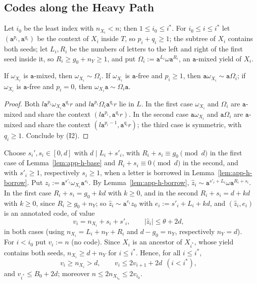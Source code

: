 \subsection{Codes along the Heavy Path}

Let $i_0$ be the least index with $n_{X_i}<n$; then $1\le i_0\le i^*$.  For
$i_0\le i\le i^*$ let $(\mathtt a^{p_i},\mathtt a^{q_i})$ be the context of
$X_i$ inside $T$, so $p_i+q_i\ge1$; the subtree of $X_i$ contains both seeds;
let $L_i,R_i$ be the numbers of letters to the left and right of the first seed
inside it, so $R_i\ge g_0+n_Y\ge1$, and put $\Omega_i:=\mathtt a^{L_i}\omega\mathtt
a^{R_i}$, an $\mathtt a$-mixed yield of $X_i$.

\begin{lemma}
\label{lem:app-h-borrow}
If $\omega_{X_i}$ is $\mathtt a$-mixed, then $\omega_{X_i}\sim\Omega_i$.  If
$\omega_{X_i}$ is $\mathtt a$-free and $p_i\ge1$, then $\mathtt a\omega_{X_i}\sim\mathtt
a\Omega_i$; if $\omega_{X_i}$ is $\mathtt a$-free and $p_i=0$, then
$\omega_{X_i}\mathtt a\sim\Omega_i\mathtt a$.
\end{lemma}

\begin{proof}
Both $l\mathtt a^{p_i}\omega_{X_i}\mathtt a^{q_i}r$ and $l\mathtt a^{p_i}\Omega_i
\mathtt a^{q_i}r$ lie in $L$.  In the first case $\omega_{X_i}$ and $\Omega_i$ are
$\mathtt a$-mixed and share the context $(l\mathtt a^{p_i},\mathtt a^{q_i}r)$.  In the
second case $\mathtt a\omega_{X_i}$ and $\mathtt a\Omega_i$ are $\mathtt a$-mixed and
share the context $(l\mathtt a^{p_i-1},\mathtt a^{q_i}r)$; the third case is
symmetric, with $q_i\ge1$.  Conclude by (I2).
\end{proof}

Choose $s_i',s_i\in[0,d]$ with $d\mid L_i+s'_i$, with $R_i+s_i\equiv g_0\pmod d$
in the first case of Lemma~\ref{lem:app-h-base} and $R_i+s_i\equiv0\pmod d$ in
the second, and with $s'_i\ge1$, respectively $s_i\ge1$, when a letter is
borrowed in Lemma~\ref{lem:app-h-borrow}.  Put $\hat z_i:=\mathtt
a^{s'_i}\omega_{X_i}\mathtt a^{s_i}$.  By Lemma~\ref{lem:app-h-borrow},
$\hat z_i\sim\mathtt a^{s'_i+L_i}\omega\mathtt a^{R_i+s_i}$.  In the first case
$R_i+s_i=g_0+kd$ with $k\ge0$, and in the second $R_i+s_i=d+kd$ with $k\ge0$,
since $R_i\ge g_0+n_Y$; so $\hat z_i\sim\mathtt a^{e_i}z_0$ with
$e_i:=s'_i+L_i+kd$, and $(\hat z_i,e_i)$ is an annotated code, of value
\[
 v_i=n_{X_i}+s_i+s'_i,\qquad|\hat z_i|\le\theta+2d,
\]
in both cases (using $n_{X_i}=L_i+n_Y+R_i$ and $d-g_0=n_Y$, respectively
$n_Y=d$).  For $i<i_0$ put $v_i:=n$ (no code).  Since $X_i$ is an ancestor of
$X_{i^*}$, whose yield contains both seeds, $n_{X_i}\ge d+n_Y$ for $i\le i^*$.
Hence, for all $i\le i^*$,
\begin{equation}
\label{eq:app-h-star}
 v_i\ge n_{X_i}>d,\qquad v_i\le2v_{i+1}+2d\ \ (i<i^*),
\end{equation}
and $v_{i^*}\le B_0+2d$; moreover $n\le2n_{X_{i_0}}\le2v_{i_0}$.

